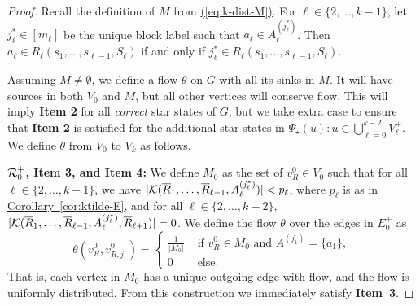 \documentclass{theoretics}
\newcommand{\eq}[1]{\hyperref[eq:#1]{(\ref*{eq:#1})}}
\newcommand{\cor}[1]{\hyperref[cor:#1]{Corollary~\ref*{cor:#1}}}
\renewcommand{\>}{\rangle}
\newcommand{\<}{\langle}
\renewcommand{\(}{\left(}
\renewcommand{\)}{\right)}
\def\abs#1{\left| #1 \right|}
\begin{document}
\begin{proof}
	Recall the definition of $M$ from \eq{k-dist-M}. For $\ell \in \{2,\dots,k-1\}$, let $j^*_{\ell}\in [m_{\ell}]$ be the unique block label such that $a_{\ell}\in A_{\ell}^{(j_{\ell}^*)}$. Then $a_{\ell}\in \overline{R}_{\ell}(s_1,\dots,s_{\ell-1},S_{\ell})$ if and only if $j_{\ell}^*\in R_{\ell}(s_1,\dots,s_{\ell-1},S_{\ell})$. 
	
	Assuming $M\neq\emptyset$, we define a flow $\theta$ on $G$ with all its sinks in $M$. It will have sources in both $V_0$ and $M$, but all other vertices will conserve flow. This will imply \textbf{Item 2} for all \emph{correct} star states of $G$, but we take extra case to ensure that \textbf{Item 2} is satisfied for the additional star states in $\Psi_\star(u):u\in \bigcup_{\ell=0}^{k-2}V_{\ell}^+$. We define $\theta$ from $V_0$ to $V_k$ as follows.

\vskip7pt
\noindent\textbf{${\cal R}_{0}^+$, Item 3, and Item 4:} We define $M_0$ as the set of $v^{0}_{R}\in V_0$ such that for all $\ell \in \{2,\dots,k-1\}$, we have $|{\cal K}(\overline{R}_1,\dots,\overline{R}_{\ell-1},A_{\ell}^{(j^*_{\ell})})|< p_{\ell}$, where $p_{\ell}$ is as in \cor{ktilde-E}, and for all $\ell\in\{2,\dots,k-2\}$, $|{\cal K}(\overline{R}_1,\dots,\overline{R}_{\ell-1},A_{\ell}^{(j_{\ell}^*)},\overline{R}_{\ell+1})| = 0$. We define the flow $\theta$ over the edges in $E_0^{+}$ as 
		$$ \theta\left(v^{0}_{R},v^{0}_{R,j_1}\right) = \begin{cases}
			\frac{1}{\abs{M_0}} &\text{ if } v_{R}^0 \in M_0 \text{ and } A^{(j_1)} = \{a_1\},\\
			0 &\text{ else}.
		\end{cases}$$
		That is, each vertex in $M_0$ has a unique outgoing edge with flow, and the flow is uniformly distributed. From this construction we immediately satisfy \textbf{Item~3}. 
		

\end{proof}
\end{document}
